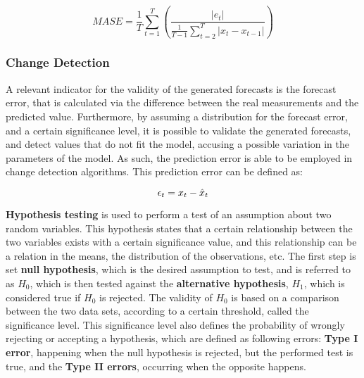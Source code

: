 \begin {equation} 
    \label{eq:mase}
    MASE = \frac{1}{T} \sum_{t=1}^T{\left ( \frac{\left | e_t \right |}{\frac{1}{T-1}\sum_{t=2}^T \left | x_t - x_{t-1} \right |} \right )}
\end {equation}

\subsubsection {Change Detection} \label{sec:change_detection}

A relevant indicator for the validity of the generated forecasts is the forecast error, that is calculated via the difference between the real measurements and the
predicted value. Furthermore, by assuming a distribution for the forecast error, and a certain significance level, it is possible to validate the generated forecasts,
and detect values that do not fit the model, accusing a possible variation in the parameters of the model. As such, the prediction error is able to be employed in 
change detection algorithms. This prediction error can be defined as:

\begin {equation*}
\centering
\epsilon_t = x_t - \hat{x}_t
\end {equation*}

\par \textbf{Hypothesis testing} is used to perform a test of an assumption about two random variables. This hypothesis states that a certain relationship between
the two variables exists with a certain significance value, and this relationship can be a relation in the means, the distribution of the observations, etc. 
The first step is set \textbf{null hypothesis}, which is the desired assumption to test, and is referred to as $H_0$, which is then tested
against the \textbf{alternative hypothesis}, $H_1$, which is considered true if $H_0$ is rejected. The validity of $H_0$ is based on a comparison between the two
data sets, according to a certain threshold, called the significance level. This significance level also defines the probability of wrongly rejecting or accepting a
hypothesis, which are defined as following errors: \textbf{Type I error}, happening when the null hypothesis is rejected, but the performed test is true, and the 
\textbf{Type II errors}, occurring when the opposite happens.

